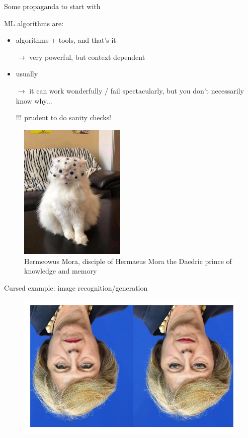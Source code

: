 \documentclass[xcolor=x11names,compress]{beamer}
\renewcommand{\(}{\begin{columns}}
\renewcommand{\)}{\end{columns}}
\newcommand{\<}[1]{\begin{column}{#1}}
\renewcommand{\>}{\end{column}}
\begin{document}
\begin{frame}{Some propaganda to start with}

\parbox{0.5\textwidth}{ML algorithms are:
\begin{itemize}
  \item algorithms + tools, and that's it
  \item[] $\to$ very powerful, but context dependent
  \item usually 
  \item[] $\to$ it can work wonderfully / fail spectacularly, but you don't
  necessarily know why...
  \item[]
  \item[!!!] prudent to do sanity checks!
\end{itemize}}\hspace*{1mm}\parbox{0.45\textwidth}{\begin{figure}
  \includegraphics[width=0.45\textwidth]{cursed}
  \caption{Hermeowus Mora, disciple of Hermaeus Mora the Daedric prince of
  knowledge and memory}
\end{figure}}

\end{frame}


\begin{frame}{Cursed example: image recognition/generation}

\begin{figure}
  \includegraphics[width=\textwidth]{cursed_1}
\end{figure}

\end{frame}
\end{document}
